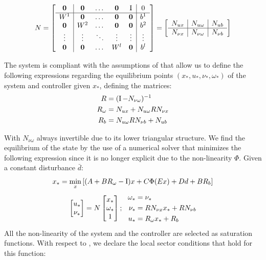 \documentclass{ifacconf}
\theoremstyle{plain}
\begin{document}
\begin{equation}\label{eq:last-N}
  N = \left[\begin{matrix}
    \begin{array}{c | c c c c | c}
      \operatorname{\mathbf{0}} & \operatorname{\mathbf{0}} & \dots & \operatorname{\mathbf{0}} & \operatorname{I} & 0 \\ 
      \hline
      W^1 & \operatorname{\mathbf{0}} & \dots & \operatorname{\mathbf{0}} & \operatorname{\mathbf{0}} & b^1 \\
      \operatorname{\mathbf{0}} & W^2 & \dots & \operatorname{\mathbf{0}} & \operatorname{\mathbf{0}} & b^2 \\
      \vdots & \vdots & \ddots & \vdots & \vdots & \vdots \\
      \operatorname{\mathbf{0}} & \operatorname{\mathbf{0}} & \dots & W^l & \operatorname{\mathbf{0}} & b^l
    \end{array}
  \end{matrix}\right] = \left[\begin{matrix}
    \begin{array}{c | c | c}
    N_{u x} & N_{u \omega} & N_{u b} \\
    \hline
    N_{\nu x} & N_{\nu \omega} & N_{\nu b}
    \end{array} 
  \end{matrix}\right]
\end{equation}


The system is compliant with the assumptions of \citep[Lemma 2]{css-extended} that allow us to define the following expressions regarding the equilibrium points $\left( x_*, u_*, \nu_*, \omega_* \right)$ of the system and controller given $x_*$, defining the matrices:
\begin{equation}
    \begin{aligned}
         R &= (\operatorname{I} - N_{\nu \omega})^{-1}\\
         R_{\omega} &= N_{u x} + N_{u \omega} R N_{\nu x}\\
         R_b &= N_{u \omega} R N_{\nu b} + N_{u b}
    \end{aligned}
\end{equation}

With $N_{\nu \omega}$ always invertible due to its lower triangular structure. We find the equilibrium of the state by the use of a numerical solver that minimizes the following expression since it is no longer explicit due to the non-linearity $\Phi$. Given a constant disturbance $\bar{d}$:
\begin{equation}
  x_* = \min_{x} \left[(A + B R_{\omega} - \operatorname{I}) x + C \Phi(E x) + D \relax{d} + B R_b \right]
\end{equation}
\begin{equation}\label{eqn:equilibrium}
  \left[\begin{matrix}u_* \\ \nu_*\end{matrix}\right] = N \left[\begin{matrix}x_* \\ \omega_* \\ 1\end{matrix}\right]; \ \  
  \begin{aligned}
    \omega_* &= \nu_*\\
    \nu_* &= R N_{\nu x} x_* + R N_{\nu b}\\
    u_* &= R_{\omega} x_* + R_b
  \end{aligned}
\end{equation}
All the non-linearity of the system and the controller are selected as saturation functions. With respect to \citep[Lemma 3]{css-extended}, we declare the local sector conditions that hold for this function:
\end{document}
